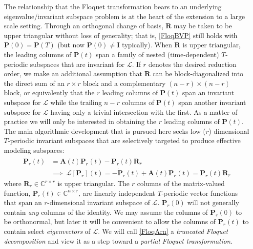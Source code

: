 \documentclass[pdflatex,sn-mathphys-num]{sn-jnl}%
\theoremstyle{thmstyleone}%
\theoremstyle{thmstyletwo}%
\theoremstyle{thmstylethree}%
\begin{document}
The relationship that the Floquet transformation bears to an underlying eigenvalue/invariant subspace problem is at the heart of the extension to a large scale setting.  Through an orthogonal change of basis, $\mathbf{R}$ may be taken to be upper triangular without loss of generality; that is, \eqref{FloqBVP} still holds with $\mathbf{P}(0)=\mathbf{P}(T)$  (but now $\mathbf{P}(0)\neq\mathbf{I}$ typically).  When $\mathbf{R}$ is upper triangular, the leading columns of $\mathbf{P}(t)$  span a family of nested (time-dependent) $T$-periodic subspaces that are invariant for $\mathscr{L}$.   
If $r$ denotes the desired reduction order, we make an additional assumption that $\mathbf{R}$ can be block-diagonalized into the direct sum of an $r\times r$ block and a complementary $(n-r)\times (n-r)$ block, or equivalently that the $r$ leading columns of $\mathbf{P}(t)$ span an invariant subspace for $\mathscr{L}$ while the trailing $n-r$ columns of $\mathbf{P}(t)$ span another invariant subspace for $\mathscr{L}$ having only a trivial intersection with the first.  
As a matter of practice we will only be interested in obtaining the $r$ leading columns of $\mathbf{P}(t)$.   The main algorithmic development that is pursued here seeks low ($r$) dimensional $T$-periodic invariant subspaces that are selectively targeted to produce effective modeling subspaces:
\begin{equation} \label{FloqArn}
\begin{aligned}
 \dot{\mathbf{P}}_r(t) &= \mathbf{A}(t)\mathbf{P}_r(t) -\mathbf{P}_r(t)\mathbf{R}_{r}\\ &\implies \ 
\mathscr{L}[\mathbf{P}_r](t)=-\dot{\mathbf{P}}_r(t)+ \mathbf{A}(t)\mathbf{P}_r(t)=\mathbf{P}_r(t)\mathbf{R}_{r}
\end{aligned}
\end{equation}
where $\mathbf{R}_{r}\in\mathbb{C}^{r\times r}$ is upper triangular.  The $r$ columns of the matrix-valued function, $\mathbf{P}_r(t)\in\mathbb{C}^{n\times r}$, are linearly independent $T$-periodic vector functions that span an $r$-dimensional invariant subspace of $\mathscr{L}$.  $\mathbf{P}_r(0)$ will not generally contain \emph{any} columns of the identity. We may assume the columns of $\mathbf{P}_r(0)$ to be orthonormal, but later it will be convenient to allow the columns of $\mathbf{P}_r(t)$ to contain select \emph{eigenvectors} of  $\mathscr{L}$.
We will call \eqref{FloqArn} a \emph{truncated Floquet decomposition} and view it as a step toward a \emph{partial Floquet transformation}. 
\end{document}
